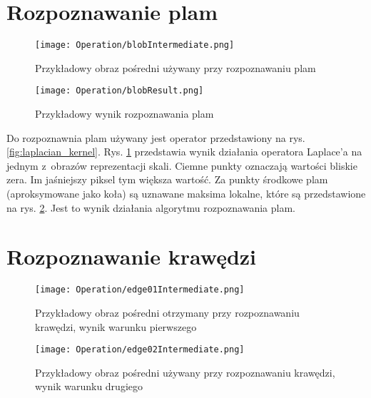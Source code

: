 \section{Rozpoznawanie plam}
\label{sec:dzialanieBlob}

\begin{figure}[h]
\begin{center}
\texttt{[image: Operation/blobIntermediate.png]}
\end{center}
\caption{Przykładowy obraz pośredni używany przy rozpoznawaniu plam}
\label{fig:blobIntermediate}
\end{figure}

\begin{figure}[h]
\begin{center}
\texttt{[image: Operation/blobResult.png]}
\end{center}
\caption{Przykładowy wynik rozpoznawania plam}
\label{fig:blobResult}
\end{figure}



Do rozpoznawnia plam używany jest operator przedstawiony na rys. \ref{fig:laplacian_kernel}. Rys. \ref{fig:blobIntermediate} przedstawia wynik działania operatora Laplace'a na jednym z~obrazów reprezentacji skali. Ciemne punkty oznaczają wartości bliskie zera. Im jaśniejszy piksel tym większa wartość. Za punkty środkowe plam (aproksymowane jako koła) są uznawane maksima lokalne, które są przedstawione na rys. \ref{fig:blobResult}. Jest to wynik działania algorytmu rozpoznawania plam.

\section{Rozpoznawanie krawędzi}
\label{sec:dzialanieEdge}

\begin{figure}[h]
\begin{center}
\texttt{[image: Operation/edge01Intermediate.png]}
\end{center}
\caption{Przykładowy obraz pośredni otrzymany przy rozpoznawaniu krawędzi, wynik warunku pierwszego}
\label{fig:edgeIntermediate1}
\end{figure}


\begin{figure}[h]
\begin{center}
\texttt{[image: Operation/edge02Intermediate.png]}
\end{center}
\caption{Przykładowy obraz pośredni używany przy rozpoznawaniu krawędzi, wynik warunku drugiego}
\label{fig:edgeIntermediate2}
\end{figure}

